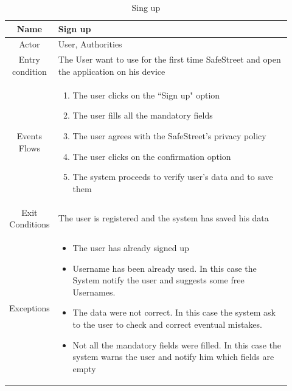 \documentclass[12pt,a4paper]{report}
\begin{document}
				\begin{table}[H]
					\centering
					\begin{tabular}{|c|p{0.92\linewidth}|}
						\hline
						Name & {Sign up} \\
						\hline
						Actor & {User, Authorities} \\
						\hline
						Entry condition & {The User want to use for the first time SafeStreet and open the application on
									his device} \\
						\hline
						Events Flows &{ 
								\vskip 4pt
								\begin{enumerate}
									\item The user clicks on the ``Sign up" option
									\item The user fills all the mandatory fields
									\item The user agrees with the SafeStreet's privacy policy
									\item The user clicks on the confirmation option
									\item The system proceeds to verify user's data and to save them
								\end{enumerate}
								\vskip 4pt}\\
						\hline
						Exit Conditions & {The user is registered and the system has saved his data} \\
						\hline
						Exceptions & {
								\vskip 4pt
								\begin{itemize}
									\item The user has already signed up
									\item Username has been already used. In this case the System notify the user and
										suggests some free Usernames.
									\item The data were not correct. In this case the system ask to the user to check and
										correct eventual mistakes.
									\item Not all the mandatory fields were filled. In this case the system warns the user
										and notify him which fields are empty
								\end{itemize}
								\vskip 4pt
						} \\
						\hline
					\end{tabular}
					\caption{Sing up}
					\label{tab: }
				\end{table}
\end{document}
